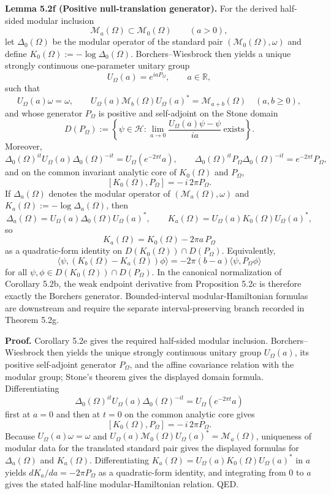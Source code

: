 \textbf{Lemma 5.2f (Positive null-translation generator).} For the derived half-sided modular inclusion
\[
\mathcal M_a(\Omega)\subset \mathcal M_0(\Omega)
\qquad (a>0),
\]
let \(\Delta_0(\Omega)\) be the modular operator of the standard pair \((\mathcal M_0(\Omega),\omega)\) and define \(K_0(\Omega):=-\log \Delta_0(\Omega)\). Borchers--Wiesbrock then yields a unique strongly continuous one-parameter unitary group
\[
U_\Omega(a)=e^{iaP_\Omega},
\qquad a\in\mathbb R,
\]
such that
\[
U_\Omega(a)\omega=\omega,
\qquad
U_\Omega(a)\mathcal M_b(\Omega)U_\Omega(a)^*=\mathcal M_{a+b}(\Omega)
\quad (a,b\ge0),
\]
and whose generator \(P_\Omega\) is positive and self-adjoint on the Stone domain
\[
D(P_\Omega)
:=
\left\{
\psi\in\mathcal H:
\lim_{a\to0}\frac{U_\Omega(a)\psi-\psi}{ia}\ \text{exists}
\right\}.
\]
Moreover,
\[
\Delta_0(\Omega)^{it}U_\Omega(a)\Delta_0(\Omega)^{-it}
=
U_\Omega(e^{-2\pi t}a),
\qquad
\Delta_0(\Omega)^{it}P_\Omega\Delta_0(\Omega)^{-it}
=
e^{-2\pi t}P_\Omega,
\]
and on the common invariant analytic core of \(K_0(\Omega)\) and \(P_\Omega\),
\[
[K_0(\Omega),P_\Omega]=-\,i\,2\pi P_\Omega.
\]
If \(\Delta_a(\Omega)\) denotes the modular operator of \((\mathcal M_a(\Omega),\omega)\) and \(K_a(\Omega):=-\log \Delta_a(\Omega)\), then
\[
\Delta_a(\Omega)=U_\Omega(a)\Delta_0(\Omega)U_\Omega(a)^*,
\qquad
K_a(\Omega)=U_\Omega(a)K_0(\Omega)U_\Omega(a)^*,
\]
so
\[
K_a(\Omega)=K_0(\Omega)-2\pi a\,P_\Omega
\]
as a quadratic-form identity on \(D(K_0(\Omega))\cap D(P_\Omega)\). Equivalently,
\[
\langle\psi,(K_b(\Omega)-K_a(\Omega))\phi\rangle
=
-2\pi(b-a)\langle\psi,P_\Omega\phi\rangle
\]
for all \(\psi,\phi\in D(K_0(\Omega))\cap D(P_\Omega)\). In the canonical normalization of Corollary 5.2b, the weak endpoint derivative from Proposition 5.2c is therefore exactly the Borchers generator. Bounded-interval modular-Hamiltonian formulas are downstream and require the separate interval-preserving branch recorded in Theorem 5.2g.

\textbf{Proof.} Corollary 5.2e gives the required half-sided modular inclusion. Borchers--Wiesbrock then yields the unique strongly continuous unitary group \(U_\Omega(a)\), its positive self-adjoint generator \(P_\Omega\), and the affine covariance relation with the modular group; Stone's theorem gives the displayed domain formula. Differentiating
\[
\Delta_0(\Omega)^{it}U_\Omega(a)\Delta_0(\Omega)^{-it}
=
U_\Omega(e^{-2\pi t}a)
\]
first at \(a=0\) and then at \(t=0\) on the common analytic core gives
\[
[K_0(\Omega),P_\Omega]=-\,i\,2\pi P_\Omega.
\]
Because \(U_\Omega(a)\omega=\omega\) and \(U_\Omega(a)\mathcal M_0(\Omega)U_\Omega(a)^*=\mathcal M_a(\Omega)\), uniqueness of modular data for the translated standard pair gives the displayed formulas for \(\Delta_a(\Omega)\) and \(K_a(\Omega)\). Differentiating \(K_a(\Omega)=U_\Omega(a)K_0(\Omega)U_\Omega(a)^*\) in \(a\) yields \(dK_a/da=-2\pi P_\Omega\) as a quadratic-form identity, and integrating from \(0\) to \(a\) gives the stated half-line modular-Hamiltonian relation. QED.


